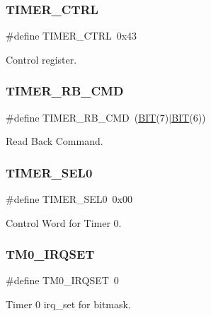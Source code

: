 \subsubsection{\texorpdfstring{T\+I\+M\+E\+R\+\_\+\+C\+T\+RL}{TIMER\_CTRL}}
{\footnotesize\ttfamily \#define T\+I\+M\+E\+R\+\_\+\+C\+T\+RL~0x43}



Control register. 

\hypertarget{group__i8254_ga4c2eecbfb96744a9c2af71dba75ecb18}{}\label{group__i8254_ga4c2eecbfb96744a9c2af71dba75ecb18} 
\subsubsection{\texorpdfstring{T\+I\+M\+E\+R\+\_\+\+R\+B\+\_\+\+C\+MD}{TIMER\_RB\_CMD}}
{\footnotesize\ttfamily \#define T\+I\+M\+E\+R\+\_\+\+R\+B\+\_\+\+C\+MD~(\hyperlink{tools_8h_a3a8ea58898cb58fc96013383d39f482c}{B\+IT}(7)$\vert$\hyperlink{tools_8h_a3a8ea58898cb58fc96013383d39f482c}{B\+IT}(6))}



Read Back Command. 

\hypertarget{group__i8254_ga6a4822642d40c248435692324a818010}{}\label{group__i8254_ga6a4822642d40c248435692324a818010} 
\subsubsection{\texorpdfstring{T\+I\+M\+E\+R\+\_\+\+S\+E\+L0}{TIMER\_SEL0}}
{\footnotesize\ttfamily \#define T\+I\+M\+E\+R\+\_\+\+S\+E\+L0~0x00}



Control Word for Timer 0. 

\hypertarget{group__i8254_gaa8b3f7a4eeaccbeb4e42a2ca6a9d0cd8}{}\label{group__i8254_gaa8b3f7a4eeaccbeb4e42a2ca6a9d0cd8} 
\subsubsection{\texorpdfstring{T\+M0\+\_\+\+I\+R\+Q\+S\+ET}{TM0\_IRQSET}}
{\footnotesize\ttfamily \#define T\+M0\+\_\+\+I\+R\+Q\+S\+ET~0}



Timer 0 irq\+\_\+set for bitmask. 

